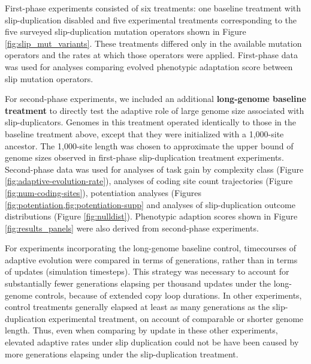 First-phase experiments consisted of six treatments: one baseline treatment with slip-duplication disabled and five experimental treatments corresponding to the five surveyed slip-duplication mutation operators shown in Figure \ref{fig:slip_mut_variants}.
These treatments differed only in the available mutation operators and the rates at which those operators were applied.
First-phase data was used for analyses comparing evolved phenotypic adaptation score between slip mutation operators.


For second-phase experiments, we included an additional \textbf{long-genome baseline treatment} to directly test the adaptive role of large genome size associated with slip-duplicators.
Genomes in this treatment operated identically to those in the baseline treatment above, except that they were initialized with a 1,000-site ancestor.
The 1,000-site length was chosen to approximate the upper bound of genome sizes observed in first-phase slip-duplication treatment experiments.
Second-phase data was used for analyses of task gain by complexity class (Figure \ref{fig:adaptive-evolution-rate}), analyses of coding site count trajectories (Figure \ref{fig:num-coding-sites}), potentiation analyses (Figures \cref{fig:potentiation,fig:potentiation-supp} and analyses of slip-duplication outcome distributions (Figure \ref{fig:nulldist}).
Phenotypic adaption scores shown in Figure \ref{fig:results_panels} were also derived from second-phase experiments.

For experiments incorporating the long-genome baseline control, timecourses of adaptive evolution were compared in terms of generations, rather than in terms of updates (simulation timesteps).
This strategy was necessary to account for substantially fewer generations elapsing per thousand updates under the long-genome controls, because of extended copy loop durations.
In other experiments, control treatments generally elapsed at least as many generations as the slip-duplication experimental treatment, on account of comparable or shorter genome length.
Thus, even when comparing by update in these other experiments, elevated adaptive rates under slip duplication could not be have been caused by more generations elapsing under the slip-duplication treatment.

